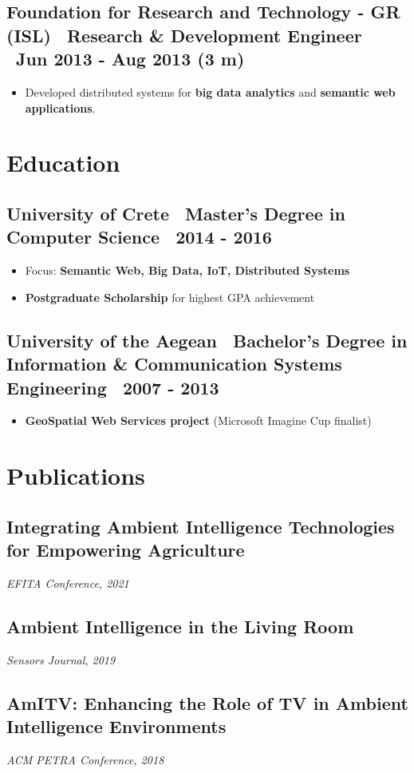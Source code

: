 \documentclass[a4paper,10pt]{article}
\begin{document}
\subsection*{Foundation for Research and Technology - GR (ISL) \textbar\ Research \& Development Engineer \textbar\ Jun 2013 - Aug 2013 (3 m)}
\begin{itemize}[left=0pt]
    \item Developed distributed systems for \textbf{big data analytics} and \textbf{semantic web applications}.
\end{itemize}


\vspace{2pt}

\section*{ Education}

\subsection*{University of Crete \textbar\ Master's Degree in Computer Science \textbar\ 2014 - 2016}
\begin{itemize}[left=0pt]
    \item Focus: \textbf{Semantic Web, Big Data, IoT, Distributed Systems}
    \item \textbf{Postgraduate Scholarship} for highest GPA achievement
\end{itemize}

\subsection*{University of the Aegean \textbar\ Bachelor's Degree in Information \& Communication Systems Engineering \textbar\ 2007 - 2013}
\begin{itemize}[left=0pt]
    \item \textbf{GeoSpatial Web Services project} (Microsoft Imagine Cup finalist)
\end{itemize}

\vspace{2pt}

\section*{ Publications}
\subsection*{Integrating Ambient Intelligence Technologies for Empowering Agriculture}
\textit{EFITA Conference, 2021}  

\subsection*{Ambient Intelligence in the Living Room}
\textit{Sensors Journal, 2019}  

\subsection*{AmITV: Enhancing the Role of TV in Ambient Intelligence Environments}
\textit{ACM PETRA Conference, 2018}  

\vspace{2pt}
\end{document}
